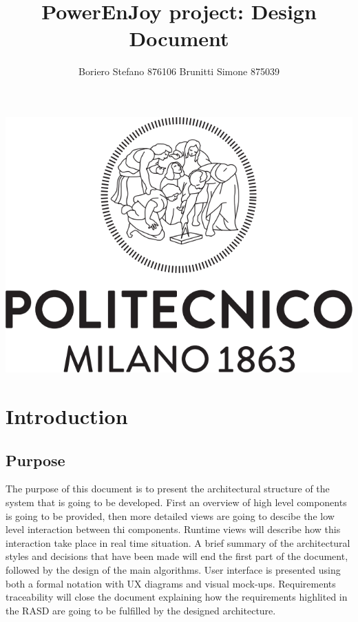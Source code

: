 \documentclass{article}
\begin{document}
\title{\textbf{{\Huge PowerEnJoy project: Design Document}}}
\author{\begin{large}
Boriero Stefano  876106  
Brunitti Simone   875039
\end{large} }


\maketitle
\includegraphics[scale=0.5]{DesignDocument/Logo_Politecnico_Milano.png} 
\newpage
\tableofcontents
\newpage

\section{Introduction}
\subsection{Purpose}
The purpose of this document is to present the architectural structure of the system that is going to be developed. First an overview of high level components is going to be provided, then more detailed views are going to descibe the low level interaction between thi components. Runtime views will describe how this interaction take place in real time situation. A brief summary of the architectural styles and decisions that have been made will end the first part of the document, followed by the design of the main algorithms.  
User interface is presented using both a formal notation with UX diagrams and visual mock-ups.  
Requirements traceability will close the document explaining how the requirements highlited in the RASD are going to be fulfilled by the designed architecture. 
\end{document}
